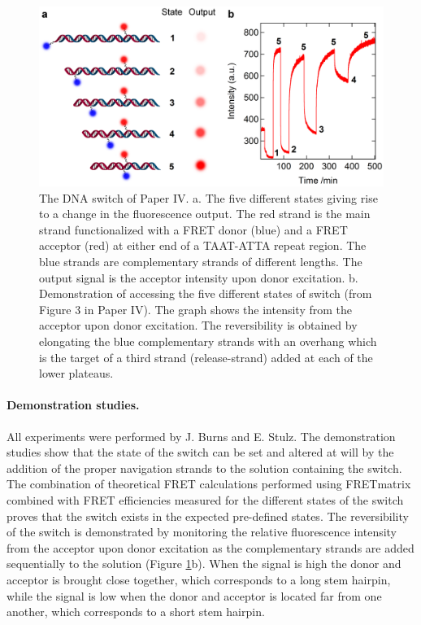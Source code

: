 \begin{figure}
    \centering
        \includegraphics[width=1\textwidth]{adds//cc_fig.png}
    \captionsetup{width=.95\textwidth}
    \caption{The DNA switch of Paper IV. a. The five different states giving rise to a change in the fluorescence output. The red strand is the main strand functionalized with a FRET donor (blue) and a FRET acceptor (red) at either end of a TAAT-ATTA repeat region. The blue strands are complementary strands of different lengths. The output signal is the acceptor intensity upon donor excitation. b. Demonstration of accessing the five different states of switch (from Figure 3 in Paper IV). The graph shows the intensity from the acceptor upon donor excitation. The reversibility is obtained by elongating the blue complementary strands with an overhang which is the target of a third strand (release-strand) added at each of the lower plateaus.}
    \label{Fig:chap_Papers_CC}
\end{figure}

 \paragraph{Demonstration studies.} All experiments were performed by J. Burns and E. Stulz. The demonstration studies show that the state of the switch can be set and altered at will by the addition of the proper navigation strands to the solution containing the switch. The combination of theoretical FRET calculations performed using FRETmatrix combined with FRET efficiencies measured for the different states of the switch proves that the switch exists in the expected pre-defined states. The reversibility of the switch is demonstrated by monitoring the relative fluorescence intensity from the acceptor upon donor excitation as the complementary strands are added sequentially to the solution (Figure \ref{Fig:chap_Papers_CC}b). When the signal is high the donor and acceptor is brought close together, which corresponds to a long stem hairpin, while the signal is low when the donor and acceptor is located far from one another, which corresponds to a short stem hairpin.

